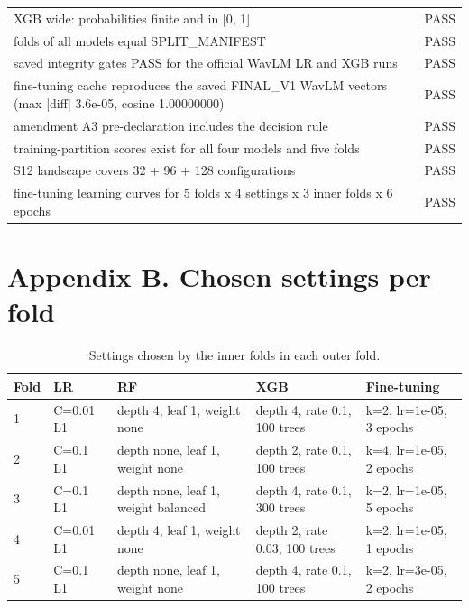 \documentclass[11pt,a4paper]{article}
\begin{document}
\begin{table}[H]
\begin{tabular}{p{13.3cm}l}
XGB wide: probabilities finite and in [0, 1] & PASS\\
folds of all models equal SPLIT\_MANIFEST & PASS\\
saved integrity gates PASS for the official WavLM LR and XGB runs & PASS\\
fine-tuning cache reproduces the saved FINAL\_V1 WavLM vectors (max |diff| 3.6e-05, cosine 1.00000000) & PASS\\
amendment A3 pre-declaration includes the decision rule & PASS\\
training-partition scores exist for all four models and five folds & PASS\\
S12 landscape covers 32 + 96 + 128 configurations & PASS\\
fine-tuning learning curves for 5 folds x 4 settings x 3 inner folds x 6 epochs & PASS\\
\bottomrule
\end{tabular}\end{table}
\section*{Appendix B. Chosen settings per fold}
\begin{table}[H]\centering\footnotesize\renewcommand{\arraystretch}{1.15}
\caption{Settings chosen by the inner folds in each outer fold.}
\begin{tabular}{lllll}
\toprule
\textbf{Fold} & \textbf{LR} & \textbf{RF} & \textbf{XGB} & \textbf{Fine-tuning}\\
\midrule
1 & C=0.01 L1 & depth 4, leaf 1, weight none & depth 4, rate 0.1, 100 trees & k=2, lr=1e-05, 3 epochs\\
2 & C=0.1 L1 & depth none, leaf 1, weight none & depth 2, rate 0.1, 100 trees & k=4, lr=1e-05, 2 epochs\\
3 & C=0.1 L1 & depth none, leaf 1, weight balanced & depth 4, rate 0.1, 300 trees & k=2, lr=1e-05, 5 epochs\\
4 & C=0.01 L1 & depth 4, leaf 1, weight none & depth 2, rate 0.03, 100 trees & k=2, lr=1e-05, 1 epochs\\
5 & C=0.1 L1 & depth none, leaf 1, weight none & depth 4, rate 0.1, 100 trees & k=2, lr=3e-05, 2 epochs\\
\bottomrule
\end{tabular}\end{table}
\end{document}
